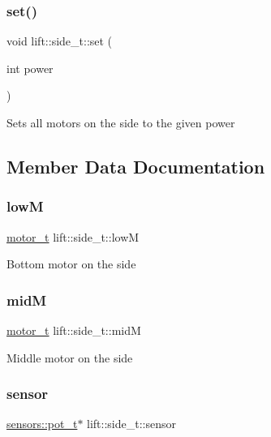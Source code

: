\subsubsection{\texorpdfstring{set()}{set()}}
{\footnotesize\ttfamily void lift\+::side\+\_\+t\+::set (\begin{DoxyParamCaption}\item[{int}]{power }\end{DoxyParamCaption})}

Sets all motors on the side to the given power 

\subsection{Member Data Documentation}
\mbox{\label{structlift_1_1side__t_a9c945e15eea72e044cd3c5303b775059}} 
\subsubsection{\texorpdfstring{lowM}{lowM}}
{\footnotesize\ttfamily \hyperlink{structmotor__t}{motor\+\_\+t} lift\+::side\+\_\+t\+::lowM}

Bottom motor on the side \mbox{\label{structlift_1_1side__t_a83c244448926521665e0f4d664b7b2b3}} 
\subsubsection{\texorpdfstring{midM}{midM}}
{\footnotesize\ttfamily \hyperlink{structmotor__t}{motor\+\_\+t} lift\+::side\+\_\+t\+::midM}

Middle motor on the side \mbox{\label{structlift_1_1side__t_a8216f7c176f2fc4f17bc8f6ce6d53fcd}} 
\subsubsection{\texorpdfstring{sensor}{sensor}}
{\footnotesize\ttfamily \hyperlink{structsensors_1_1pot__t}{sensors\+::pot\+\_\+t}$\ast$ lift\+::side\+\_\+t\+::sensor}

